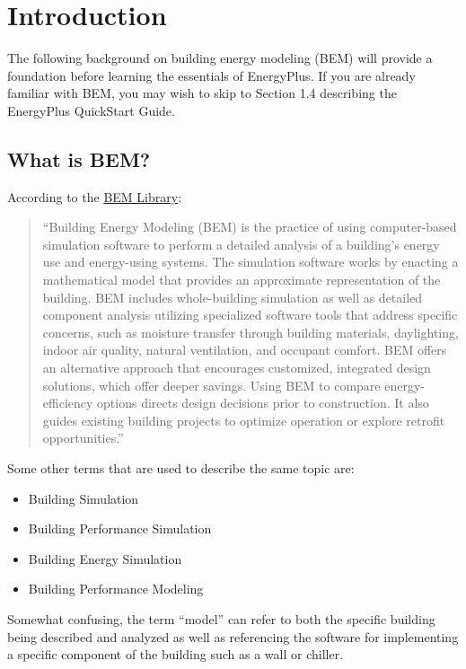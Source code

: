 

\chapter{Introduction}

The following background on building energy modeling (BEM) will provide
a foundation before learning the essentials of EnergyPlus. If you
are already familiar with BEM, you may wish to skip to Section 1.4
describing the EnergyPlus QuickStart Guide. 

\section{What is BEM?}

According to the \href{https://www.bemlibrary.com/index.php/owners-managers/introduction/what-bem/}{BEM Library}:
\begin{quotation}
``Building Energy Modeling (BEM) is the practice of using computer-based
simulation software to perform a detailed analysis of a building\textquoteright s
energy use and energy-using systems. The simulation software works
by enacting a mathematical model that provides an approximate representation
of the building. BEM includes whole-building simulation as well as
detailed component analysis utilizing specialized software tools that
address specific concerns, such as moisture transfer through building
materials, daylighting, indoor air quality, natural ventilation, and
occupant comfort. BEM offers an alternative approach that encourages
customized, integrated design solutions, which offer deeper savings.
Using BEM to compare energy-efficiency options directs design decisions
prior to construction. It also guides existing building projects to
optimize operation or explore retrofit opportunities.''
\end{quotation}
Some other terms that are used to describe the same topic are:
\begin{itemize}
\item Building Simulation
\item Building Performance Simulation
\item Building Energy Simulation
\item Building Performance Modeling
\end{itemize}
Somewhat confusing, the term ``model'' can refer to both the specific
building being described and analyzed as well as referencing the software
for implementing a specific component of the building such as a wall
or chiller.

